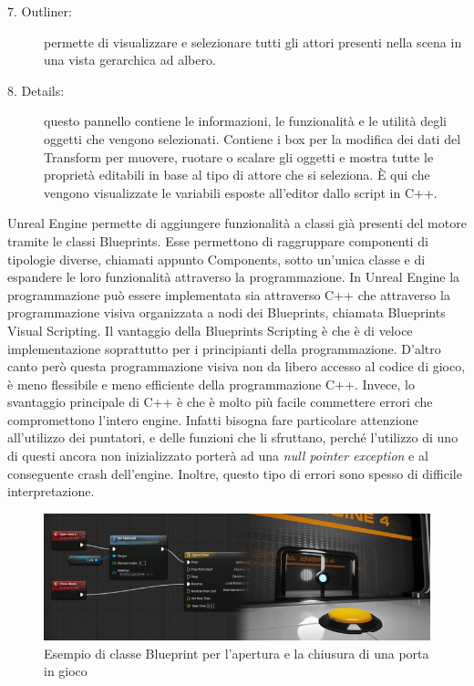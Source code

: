 \begin{description}
    \item [7. Outliner:] permette di visualizzare e selezionare tutti gli attori presenti nella scena in una vista gerarchica ad albero.
    \item [8. Details:] questo pannello contiene le informazioni, le funzionalità e le utilità degli oggetti che vengono selezionati. Contiene i box per la modifica dei dati del Transform per muovere, ruotare o scalare gli oggetti e mostra tutte le proprietà editabili in base al tipo di attore che si seleziona. È qui che vengono visualizzate le variabili esposte all'editor dallo script in C++.
\end{description}

Unreal Engine permette di aggiungere funzionalità a classi già presenti del motore tramite le classi Blueprints.
%
Esse permettono di raggruppare componenti di tipologie diverse, chiamati appunto Components, sotto un'unica classe e di espandere le loro funzionalità attraverso la programmazione.
%
In Unreal Engine la programmazione può essere implementata sia attraverso C++ che attraverso la programmazione visiva organizzata a nodi dei Blueprints, chiamata Blueprints Visual Scripting. 
%
Il vantaggio della Blueprints Scripting è che è di veloce implementazione soprattutto per i principianti della programmazione. 
%
D'altro canto però questa programmazione visiva non da libero accesso al codice di gioco, è meno flessibile e meno efficiente della programmazione C++.
%
Invece, lo svantaggio principale di C++ è che è molto più facile commettere errori che compromettono l'intero engine.
%
Infatti bisogna fare particolare attenzione all'utilizzo dei puntatori, e delle funzioni che li sfruttano, perché l'utilizzo di uno di questi ancora non inizializzato porterà ad una \textit{null pointer exception} e al conseguente crash dell'engine.
%
Inoltre, questo tipo di errori sono spesso di difficile interpretazione.

\begin{figure}[!ht]
    \centering
    \includegraphics[width=\textwidth]{figure/BlueprintClass.jpg}
    \caption{Esempio di classe Blueprint per l'apertura e la chiusura di una porta in gioco}
\end{figure}

